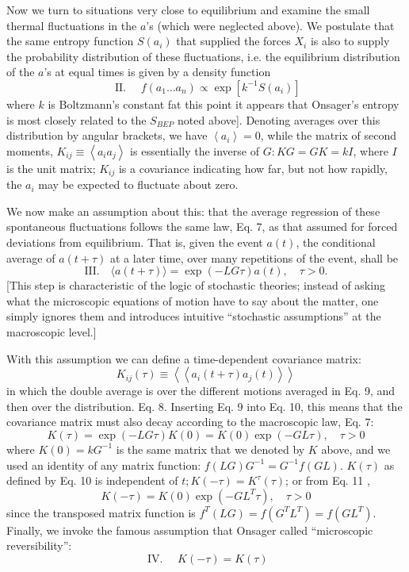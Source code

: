 \documentclass{article}
\begin{document}
Now we turn to situations very close to equilibrium and examine the small thermal fluctuations in the $a$'s (which were neglected above). We postulate that the same entropy function $S\left(a_i\right)$ that supplied the forces $X_i$ is also to supply the probability distribution of these fluctuations, i.e. the equilibrium distribution of the $a$'s at equal times is given by a density function
$$
\text { II. } \quad f\left(a_1 \ldots a_n\right) \propto \exp \left[k^{-1} S\left(a_i\right)\right]
$$
where $k$ is Boltzmann's constant fat this point it appears that Onsager's entropy is most closely related to the $S_{B E P}$ noted above]. Denoting averages over this distribution by angular brackets, we have $\left\langle a_i\right\rangle=0$, while the matrix of second moments, $K_{i j} \equiv\left\langle a_i a_j\right\rangle$ is essentially the inverse of $G: K G=G K=k I$, where $I$ is the unit matrix; $K_{i j}$ is a covariance indicating how far, but not how rapidly, the $a_i$ may be expected to fluctuate about zero.

We now make an assumption about this: that the average regression of these spontaneous fluctuations follows the same law, Eq. 7, as that assumed for forced deviations from equilibrium. That is, given the event $a(t)$, the conditional average of $a(t+\tau)$ at a later time, over many repetitions of the event, shall be
$$
\text{III.} \quad \langle a(t+\tau)\rangle=\exp (-L G \tau) a(t), \quad \tau>0.
$$
[This step is characteristic of the logic of stochastic theories; instead of asking what the microscopic equations of motion have to say about the matter, one simply ignores them and introduces intuitive ``stochastic assumptions'' at the macroscopic level.]

With this assumption we can define a time-dependent covariance matrix:
$$
K_{i j}(\tau) \equiv\left\langle\left\langle a_i(t+\tau) a_j(t)\right\rangle\right\rangle
$$
in which the double average is over the different motions averaged in Eq. 9, and then over the distribution. Eq. 8. Inserting Eq. 9 into Eq. 10, this means that the covariance matrix must also decay according to the macroscopic law, Eq. 7:
$$
K(\tau)=\exp (-L G \tau) K(0)=K(0) \exp (-G L \tau), \quad \tau>0
$$
where $K(0)=k G^{-1}$ is the same matrix that we denoted by $K$ above, and we used an identity of any matrix function: $f(L G) G^{-1}=G^{-1} f(G L)$. $K(\tau)$ as defined by Eq. 10 is independent of $t ; K(-\tau)=K^\tau(\tau)$; or from Eq. 11 ,
$$
K(-\tau)=K(0) \exp \left(-G L^T \tau\right), \quad \tau>0
$$
since the transposed matrix function is $f^T(L G)=f\left(G^T L^T\right)=f\left(G L^T\right)$.
Finally, we invoke the famous assumption that Onsager called ``microscopic reversibility'':
$$
\text { IV. } \quad K(-\tau)=K(\tau)
$$
\end{document}
